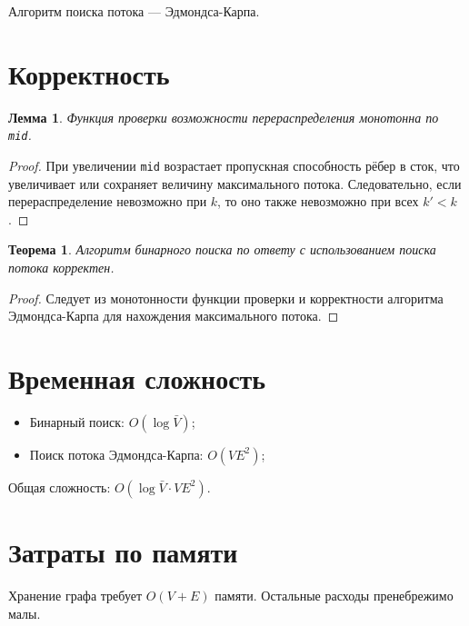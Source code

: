 \documentclass{article}
\newtheorem{lemma}{Лемма}  %
\newtheorem{theorem}{Теорема}  %
\begin{document}
Алгоритм поиска потока — Эдмондса-Карпа.

\section{Корректность}

\begin{lemma}
    Функция проверки возможности перераспределения монотонна по \texttt{mid}.
\end{lemma}

\begin{proof}
    При увеличении \texttt{mid} возрастает пропускная способность рёбер в сток, что увеличивает или сохраняет величину максимального потока. Следовательно, если перераспределение невозможно при $k$, то оно также невозможно при всех $k' < k$.
\end{proof}

\begin{theorem}
    Алгоритм бинарного поиска по ответу с использованием поиска потока корректен.
\end{theorem}

\begin{proof}
    Следует из монотонности функции проверки и корректности алгоритма Эдмондса-Карпа для нахождения максимального потока.
\end{proof}

\section{Временная сложность}

\begin{itemize}
    \item Бинарный поиск: $O(\log \bar{V})$;
    \item Поиск потока Эдмондса-Карпа: $O(VE^2)$;
\end{itemize}

Общая сложность: $O(\log \bar{V} \cdot VE^2)$.

\section{Затраты по памяти}

Хранение графа требует $O(V + E)$ памяти. Остальные расходы пренебрежимо малы.
\end{document}
